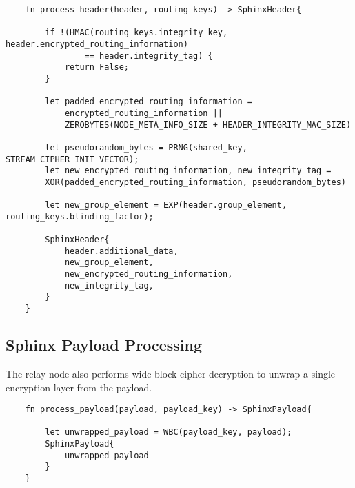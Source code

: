 \begin{verbatim}
    fn process_header(header, routing_keys) -> SphinxHeader{
        
        if !(HMAC(routing_keys.integrity_key, header.encrypted_routing_information) 
                == header.integrity_tag) {
            return False;
        }
        
        let padded_encrypted_routing_information = 
            encrypted_routing_information || 
            ZEROBYTES(NODE_META_INFO_SIZE + HEADER_INTEGRITY_MAC_SIZE)
        
        let pseudorandom_bytes = PRNG(shared_key, STREAM_CIPHER_INIT_VECTOR); 
        let new_encrypted_routing_information, new_integrity_tag = 
        XOR(padded_encrypted_routing_information, pseudorandom_bytes) 
        
        let new_group_element = EXP(header.group_element, routing_keys.blinding_factor);
        
        SphinxHeader{
            header.additional_data, 
            new_group_element, 
            new_encrypted_routing_information,
            new_integrity_tag,
        }
    }
\end{verbatim}

\subsection{Sphinx Payload Processing}
The relay node also performs wide-block cipher decryption to unwrap a single encryption layer from the payload. 

\begin{verbatim}
    fn process_payload(payload, payload_key) -> SphinxPayload{
        
        let unwrapped_payload = WBC(payload_key, payload);
        SphinxPayload{
            unwrapped_payload
        }
    }
\end{verbatim}